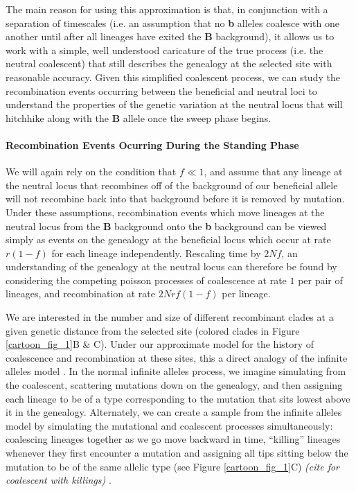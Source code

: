 \documentclass[a4paper,10pt]{article}
\newcommand{\jb}[1]{{\it\color{blue} (#1)} }
\begin{document}
The main reason for using this approximation is that, in conjunction with a separation of timescales (i.e. an assumption that no \textbf{b} alleles coalesce with one another until after all lineages have exited the \textbf{B} background), it allows us to work with a simple, well understood caricature of the true process (i.e. the neutral coalescent) that still describes the genealogy at the selected site with reasonable accuracy. Given this simplified coalescent process, we can study the recombination events occurring between the beneficial and neutral loci to understand the properties of the genetic variation at the neutral locus that will hitchhike along with the \textbf{B} allele once the sweep phase begins.

\paragraph{Recombination Events Ocurring During the Standing Phase}

We will again rely on the condition that $f \ll 1$, and assume that any lineage at the neutral locus that recombines off of the background of our beneficial allele will not recombine back into that background before it is removed by mutation. Under these assumptions, recombination events which move lineages at the neutral locus from the \textbf{B} background onto the \textbf{b} background can be viewed simply as events on the genealogy at the beneficial locus which occur at rate $r\left(1-f\right)$ for each lineage independently. Rescaling time by $2Nf$, an understanding of the genealogy at the neutral locus can therefore be found by considering the competing poisson processes of coalescence at rate $1$ per pair of lineages, and recombination at rate $2Nrf(1-f)$ per lineage.

We are interested in the number and size of different recombinant clades at a given genetic distance from the selected site (colored clades in Figure \ref{cartoon_fig_1}B \& C). Under our approximate model for the history of coalescence and recombination at these sites, this a direct analogy of the infinite alleles model \citep{}. In the normal infinite alleles process, we imagine simulating from the coalescent, scattering mutations down on the genealogy, and then assigning each lineage to be of a type corresponding to the mutation that sits lowest above it in the genealogy. Alternately, we can create a sample from the infinite alleles model by simulating the mutational and coalescent processes simultaneously: coalescing lineages together as we go move backward in time, ``killing'' lineages whenever they first encounter a mutation and assigning all tips sitting below the mutation to be of the same allelic type (see Figure \ref{cartoon_fig_1}C) \jb{cite for coalescent with killings}.
\end{document}
